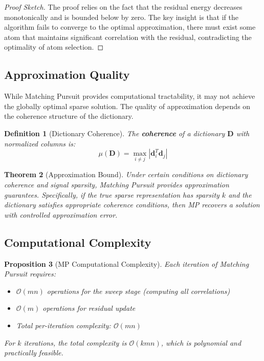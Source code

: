 \documentclass[12pt]{article}
\newtheorem{theorem}{Theorem}[section]
\newtheorem{proposition}[theorem]{Proposition}
\newtheorem{definition}[theorem]{Definition}
\begin{document}
\begin{proof}[Proof Sketch]
    The proof relies on the fact that the residual energy decreases monotonically and is bounded below by zero. The key insight is that if the algorithm fails to converge to the optimal approximation, there must exist some atom that maintains significant correlation with the residual, contradicting the optimality of atom selection.
\end{proof}

\subsection{Approximation Quality}

While Matching Pursuit provides computational tractability, it may not achieve the globally optimal sparse solution. The quality of approximation depends on the coherence structure of the dictionary.

\begin{definition}[Dictionary Coherence]\label{def:coherence}
    The \textbf{coherence} of a dictionary $\mathbf{D}$ with normalized columns is:
    \begin{equation}
        \mu(\mathbf{D}) = \max_{i \neq j} |\mathbf{d}_i^T \mathbf{d}_j|
    \end{equation}
\end{definition}

\begin{theorem}[Approximation Bound]\label{thm:approximation_bound}
    Under certain conditions on dictionary coherence and signal sparsity, Matching Pursuit provides approximation guarantees. Specifically, if the true sparse representation has sparsity $k$ and the dictionary satisfies appropriate coherence conditions, then MP recovers a solution with controlled approximation error.
\end{theorem}

\subsection{Computational Complexity}

\begin{proposition}[MP Computational Complexity]\label{prop:mp_complexity}
    Each iteration of Matching Pursuit requires:
    \begin{itemize}
        \item $\mathcal{O}(mn)$ operations for the sweep stage (computing all correlations)
        \item $\mathcal{O}(m)$ operations for residual update
        \item Total per-iteration complexity: $\mathcal{O}(mn)$
    \end{itemize}

    For $k$ iterations, the total complexity is $\mathcal{O}(kmn)$, which is polynomial and practically feasible.
\end{proposition}
\end{document}
